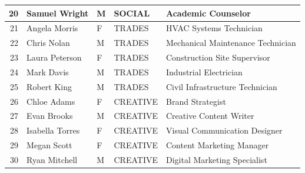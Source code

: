 \documentclass[12pt]{article}
\begin{document}
\begin{table}[H]
\begin{tabular}{rllll}
20 & Samuel Wright & M & SOCIAL & Academic Counselor \\
\midrule
21 & Angela Morris & F & TRADES & HVAC Systems Technician \\
22 & Chris Nolan & M & TRADES & Mechanical Maintenance Technician \\
23 & Laura Peterson & F & TRADES & Construction Site Supervisor \\
24 & Mark Davis & M & TRADES & Industrial Electrician \\
25 & Robert King & M & TRADES & Civil Infrastructure Technician \\
\midrule
26 & Chloe Adams & F & CREATIVE & Brand Strategist \\
27 & Evan Brooks & M & CREATIVE & Creative Content Writer \\
28 & Isabella Torres & F & CREATIVE & Visual Communication Designer \\
29 & Megan Scott & F & CREATIVE & Content Marketing Manager \\
30 & Ryan Mitchell & M & CREATIVE & Digital Marketing Specialist \\
\bottomrule
\end{tabular}
\end{table}
\end{document}
